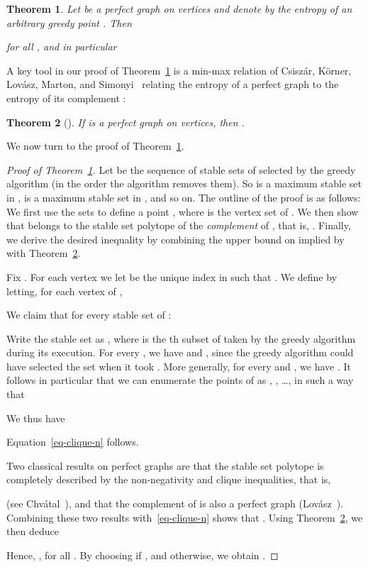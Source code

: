 \documentclass[12pt,oneside]{article}
\newtheorem{theorem}{Theorem}
\begin{document}
\begin{theorem}
\label{th-greedy-perfect-graphs}
Let  be a perfect graph on  vertices and denote
by  the entropy of an arbitrary greedy point . Then

for all , and in particular

\end{theorem}

A key tool in our proof of Theorem~\ref{th-greedy-perfect-graphs} is a min-max relation of Csisz{\'a}r, K{\"o}rner, Lov{\'a}sz, Marton, and Simonyi~\cite{CKLMS90} relating the entropy of a perfect graph  to the entropy of its complement :

\begin{theorem}[\hspace{-.01em}\cite{CKLMS90}]
\label{th-sum-log-n}
If  is a perfect graph on  vertices, then .
\end{theorem}

We now turn to the proof of Theorem~\ref{th-greedy-perfect-graphs}.

\begin{proof}[Proof of Theorem~\ref{th-greedy-perfect-graphs}]
Let  be the sequence of stable sets of  selected by the greedy
algorithm (in the order the algorithm removes them).
So  is a maximum stable set in ,  is a maximum stable set in , and so on.
The outline of the proof is as follows: We first use the sets
  to define a point , where  is the vertex set of . We then
show that   belongs to the stable set polytope of the {\em complement}  of , that
is, . Finally, we derive the desired inequality by combining the
upper bound on  implied by  with Theorem~\ref{th-sum-log-n}.

Fix . For each vertex  we let  be the unique index in 
such that . We define  by letting, for each vertex  of ,

We claim that for every stable set  of :


Write the stable set  as , where  is the th subset of  taken by the greedy algorithm during its execution.
For every , we have   and , since the greedy algorithm could have
selected the set  when it took .
More generally, for every  and , we have
. It follows in particular that we can enumerate the points of  as , , \ldots,  in such a way that

We thus have

Equation~\eqref{eq-clique-n} follows.

Two classical results on perfect graphs are that the stable set polytope is completely described
by the non-negativity and clique inequalities, that is,

(see Chv\'atal~\cite{C75}), and that the complement  of  is also a
perfect graph (Lov\'asz~\cite{L72}). Combining these two results with~\eqref{eq-clique-n}
shows that .
Using Theorem~\ref{th-sum-log-n}, we then deduce

Hence, , for all .
By choosing  if , and  otherwise, we obtain
.
\end{proof}
\end{document}
